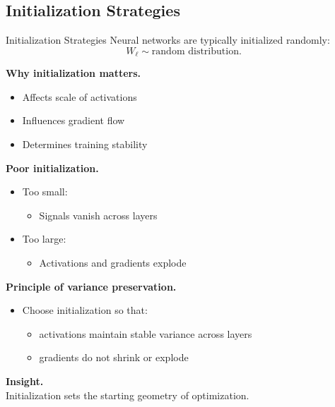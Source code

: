 \documentclass[aspectratio=169,11pt]{beamer}
\begin{document}
\subsection{Initialization Strategies}
\begin{frame}[t,allowframebreaks]{Initialization Strategies}
\small
Neural networks are typically initialized randomly:
\[
W_\ell \sim \text{random distribution}.
\]

\textbf{Why initialization matters.}\\ \begin{itemize}
    \item Affects scale of activations
    \item Influences gradient flow
    \item Determines training stability
\end{itemize}

\textbf{Poor initialization.}\\ \begin{itemize}
    \item Too small:
    \begin{itemize}
        \item Signals vanish across layers
    \end{itemize}

    \item Too large:
    \begin{itemize}
        \item Activations and gradients explode
    \end{itemize}
\end{itemize}

\textbf{Principle of variance preservation.}\\ \begin{itemize}
    \item Choose initialization so that:
    \begin{itemize}
        \item activations maintain stable variance across layers
        \item gradients do not shrink or explode
    \end{itemize}
\end{itemize}

\textbf{Insight.}\\ Initialization sets the starting geometry of optimization.
\end{frame}
\end{document}
